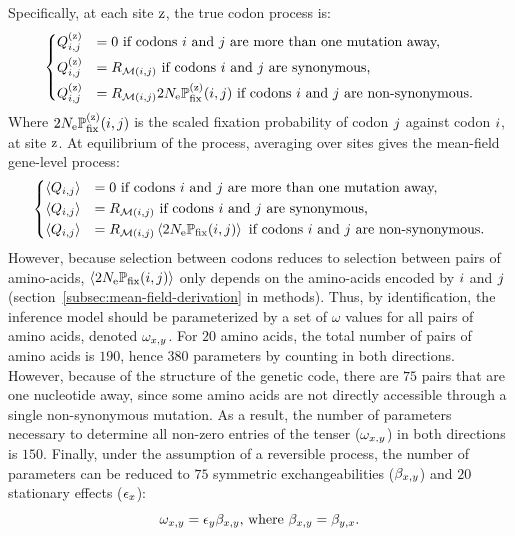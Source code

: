 \documentclass{article}
\begin{document}
Specifically, at each site $\text{z}$, the true codon process is:
\begin{equation}
 \begin{dcases}
 Q_{{i}, {j}}^{(\text{z})} & = 0 \text{ if codons ${i}$ and ${j}$ are more than one mutation away,} \\
 Q_{{i}, {j}}^{(\text{z})} & = R_{\mathcal{M}({i}, {j})} \text{ if codons ${i}$ and ${j}$ are {synonymous},} \\
 Q_{{i}, {j}}^{(\text{z})} & = R_{\mathcal{M}({i}, {j})} 2 N_{\text{e}} \mathbb{P}_{\text{fix}}^{(\text{z})}({i}, {j}) \text{ if codons ${i}$ and ${j}$ are non-synonymous}.
 \end{dcases}
 \label{eq:codon-site-processs}
\end{equation}
Where $2 N_{\text{e}} \mathbb{P}_{\text{fix}}^{(\text{z})}({i}, {j})$ is the scaled fixation probability of codon ${j}$ against codon ${i}$, at site $\text{z}$.
At equilibrium of the process, averaging over sites gives the mean-field gene-level process:
\begin{equation}
 \begin{dcases}
 \left\langle Q_{{i}, {j}} \right\rangle & = 0 \text{ if codons ${i}$ and ${j}$ are more than one mutation away,} \\
 \left\langle Q_{{i}, {j}} \right\rangle & = R_{\mathcal{M}({i}, {j})} \text{ if codons ${i}$ and ${j}$ are {synonymous},} \\
 \left\langle Q_{{i}, {j}} \right\rangle & = R_{\mathcal{M}({i}, {j})} \left\langle 2 N_{\text{e}} \mathbb{P}_{\text{fix}} ({i}, {j}) \right\rangle \text{ if codons ${i}$ and ${j}$ are non-synonymous}.
 \end{dcases}
 \label{eq:codon-avg-process}
\end{equation}
However, because selection between codons reduces to selection between pairs of amino-acids, $\left\langle 2 N_{\text{e}} \mathbb{P}_{\text{fix}} ({i}, {j}) \right\rangle$ only depends on the amino-acids encoded by ${i}$ and ${j}$ (section~\ref{subsec:mean-field-derivation} in methods).
Thus, by identification, the inference model should be parameterized by a set of $\omega$ values for all pairs of amino acids, denoted $\omega_{x, y}$.
For $20$ amino acids, the total number of pairs of amino acids is $190$, hence $380$ parameters by counting in both directions.
However, because of the structure of the genetic code, there are $75$ pairs that are one nucleotide away, since some amino acids are not directly accessible through a single {non-synonymous} mutation.
As a result, the number of parameters necessary to determine all non-zero entries of the tenser ($\omega_{x, y}$) in both directions is $150$.
Finally, under the assumption of a reversible process, the number of parameters can be reduced to $75$ symmetric exchangeabilities ($\beta_{x, y}$) and $20$ stationary effects ($\epsilon_{x}$):
\begin{equation}
 \omega_{x, y} = \epsilon_{y} \beta_{x, y}\text{, where } \beta_{x, y} = \beta_{y, x}.\label{eq:omega-reversible}
\end{equation}
\end{document}
